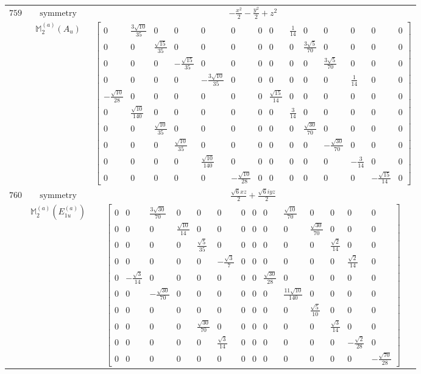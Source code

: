 \documentclass[fleqn,8pt,landscape]{jsarticle}
\begin{document}
\begin{longtable}{ccc}
$ 759 $ & $ \text{symmetry} $ & $ - \frac{x^{2}}{2} - \frac{y^{2}}{2} + z^{2} $ \\
$  $ & $ \mathbb{M}_{2}^{(a)}(A_{u}) $ & $ \begin{bmatrix} 0 & \frac{3 \sqrt{10}}{35} & 0 & 0 & 0 & 0 & 0 & 0 & \frac{1}{14} & 0 & 0 & 0 & 0 & 0 \\ 0 & 0 & \frac{\sqrt{15}}{35} & 0 & 0 & 0 & 0 & 0 & 0 & \frac{3 \sqrt{5}}{70} & 0 & 0 & 0 & 0 \\ 0 & 0 & 0 & - \frac{\sqrt{15}}{35} & 0 & 0 & 0 & 0 & 0 & 0 & \frac{3 \sqrt{5}}{70} & 0 & 0 & 0 \\ 0 & 0 & 0 & 0 & - \frac{3 \sqrt{10}}{35} & 0 & 0 & 0 & 0 & 0 & 0 & \frac{1}{14} & 0 & 0 \\ - \frac{\sqrt{10}}{28} & 0 & 0 & 0 & 0 & 0 & 0 & \frac{\sqrt{15}}{14} & 0 & 0 & 0 & 0 & 0 & 0 \\ 0 & \frac{\sqrt{10}}{140} & 0 & 0 & 0 & 0 & 0 & 0 & \frac{3}{14} & 0 & 0 & 0 & 0 & 0 \\ 0 & 0 & \frac{\sqrt{10}}{35} & 0 & 0 & 0 & 0 & 0 & 0 & \frac{\sqrt{30}}{70} & 0 & 0 & 0 & 0 \\ 0 & 0 & 0 & \frac{\sqrt{10}}{35} & 0 & 0 & 0 & 0 & 0 & 0 & - \frac{\sqrt{30}}{70} & 0 & 0 & 0 \\ 0 & 0 & 0 & 0 & \frac{\sqrt{10}}{140} & 0 & 0 & 0 & 0 & 0 & 0 & - \frac{3}{14} & 0 & 0 \\ 0 & 0 & 0 & 0 & 0 & - \frac{\sqrt{10}}{28} & 0 & 0 & 0 & 0 & 0 & 0 & - \frac{\sqrt{15}}{14} & 0 \end{bmatrix} $ \\ \hline
$ 760 $ & $ \text{symmetry} $ & $ \frac{\sqrt{6} x z}{2} + \frac{\sqrt{6} i y z}{2} $ \\
$  $ & $ \mathbb{M}_{2}^{(a)}(E_{1u}^{(a)}) $ & $ \begin{bmatrix} 0 & 0 & \frac{3 \sqrt{30}}{70} & 0 & 0 & 0 & 0 & 0 & 0 & \frac{\sqrt{10}}{70} & 0 & 0 & 0 & 0 \\ 0 & 0 & 0 & \frac{\sqrt{10}}{14} & 0 & 0 & 0 & 0 & 0 & 0 & \frac{\sqrt{30}}{70} & 0 & 0 & 0 \\ 0 & 0 & 0 & 0 & \frac{\sqrt{5}}{35} & 0 & 0 & 0 & 0 & 0 & 0 & \frac{\sqrt{2}}{14} & 0 & 0 \\ 0 & 0 & 0 & 0 & 0 & - \frac{\sqrt{3}}{7} & 0 & 0 & 0 & 0 & 0 & 0 & \frac{\sqrt{2}}{14} & 0 \\ 0 & - \frac{\sqrt{3}}{14} & 0 & 0 & 0 & 0 & 0 & 0 & \frac{\sqrt{30}}{28} & 0 & 0 & 0 & 0 & 0 \\ 0 & 0 & - \frac{\sqrt{30}}{70} & 0 & 0 & 0 & 0 & 0 & 0 & \frac{11 \sqrt{10}}{140} & 0 & 0 & 0 & 0 \\ 0 & 0 & 0 & 0 & 0 & 0 & 0 & 0 & 0 & 0 & \frac{\sqrt{5}}{10} & 0 & 0 & 0 \\ 0 & 0 & 0 & 0 & \frac{\sqrt{30}}{70} & 0 & 0 & 0 & 0 & 0 & 0 & \frac{\sqrt{3}}{14} & 0 & 0 \\ 0 & 0 & 0 & 0 & 0 & \frac{\sqrt{3}}{14} & 0 & 0 & 0 & 0 & 0 & 0 & - \frac{\sqrt{2}}{28} & 0 \\ 0 & 0 & 0 & 0 & 0 & 0 & 0 & 0 & 0 & 0 & 0 & 0 & 0 & - \frac{\sqrt{70}}{28} \end{bmatrix} $ \\ \hline

\end{longtable}
\end{document}
